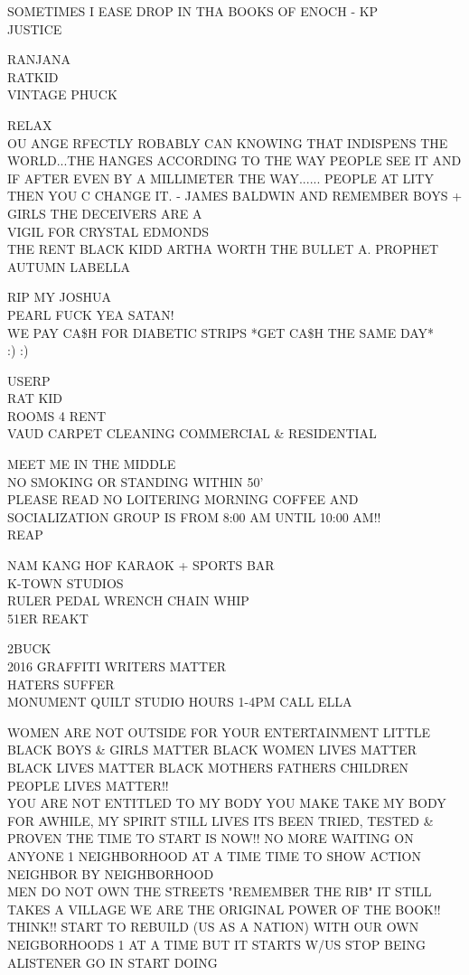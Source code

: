 \documentclass[10pt,letterpaper]{article}
\begin{document}
SOMETIMES I EASE DROP IN THA BOOKS OF ENOCH {-} KP\\
JUSTICE

RANJANA\\
RATKID\\
VINTAGE PHUCK

RELAX\\
OU ANGE RFECTLY ROBABLY CAN KNOWING THAT INDISPENS THE WORLD...THE HANGES ACCORDING TO THE WAY PEOPLE SEE IT AND IF AFTER EVEN BY A MILLIMETER THE WAY...... PEOPLE AT LITY THEN YOU C CHANGE IT. {-} JAMES BALDWIN AND REMEMBER BOYS + GIRLS THE DECEIVERS ARE A\\
VIGIL FOR CRYSTAL EDMONDS\\
THE RENT BLACK KIDD ARTHA WORTH THE BULLET A. PROPHET AUTUMN LABELLA

RIP MY JOSHUA\\
PEARL FUCK YEA SATAN!\\
WE PAY CA\$H FOR DIABETIC STRIPS *GET CA\$H THE SAME DAY*\\
:) :)

USERP\\
RAT KID\\
ROOMS 4 RENT\\
VAUD CARPET CLEANING COMMERCIAL \& RESIDENTIAL

MEET ME IN THE MIDDLE\\
NO SMOKING OR STANDING WITHIN 50'\\
PLEASE READ NO LOITERING MORNING COFFEE AND SOCIALIZATION GROUP IS FROM 8:00 AM UNTIL 10:00 AM!!\\
REAP

NAM KANG HOF KARAOK + SPORTS BAR\\
K{-}TOWN STUDIOS\\
RULER PEDAL WRENCH CHAIN WHIP\\
51ER REAKT

2BUCK\\
2016 GRAFFITI WRITERS MATTER\\
HATERS SUFFER\\
MONUMENT QUILT STUDIO HOURS 1{-}4PM CALL ELLA

WOMEN ARE NOT OUTSIDE FOR YOUR ENTERTAINMENT LITTLE BLACK BOYS \& GIRLS MATTER BLACK WOMEN LIVES MATTER BLACK LIVES MATTER BLACK MOTHERS FATHERS CHILDREN PEOPLE LIVES MATTER!!\\
YOU ARE NOT ENTITLED TO MY BODY YOU MAKE TAKE MY BODY FOR AWHILE, MY SPIRIT STILL LIVES ITS BEEN TRIED, TESTED \& PROVEN THE TIME TO START IS NOW!!  NO MORE WAITING ON ANYONE 1 NEIGHBORHOOD AT A TIME TIME TO SHOW ACTION NEIGHBOR BY NEIGHBORHOOD\\
MEN DO NOT OWN THE STREETS "REMEMBER THE RIB" IT STILL TAKES A VILLAGE WE ARE THE ORIGINAL POWER OF THE BOOK!! THINK!! START TO REBUILD (US AS A NATION) WITH OUR OWN NEIGBORHOODS 1 AT A TIME BUT IT STARTS W/US STOP BEING ALISTENER GO IN START DOING
\end{document}

